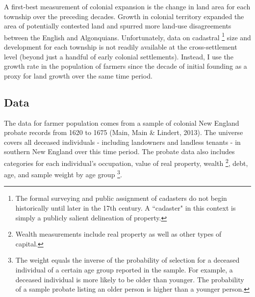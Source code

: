 \documentclass[sn-mathphys]{sn-jnl}%
\theoremstyle{thmstyleone}%
\theoremstyle{thmstyletwo}%
\theoremstyle{thmstylethree}%
\begin{document}
A first-best measurement of colonial expansion is the change in land area for each township over the preceding decades. Growth in colonial territory expanded the area of potentially contested land and spurred more land-use disagreements between the English and Algonquians. Unfortunately, data on cadastral \footnote{The formal surveying and public assignment of cadasters do not begin historically until later in the 17th century. A ``cadaster" in this context is simply a publicly salient delineation of property.} size and development for each township is not readily available at the cross-settlement level (beyond just a handful of early colonial settlements). Instead, I use the growth rate in the population of farmers since the decade of initial founding as a proxy for land growth over the same time period.

\subsection{Data}

The data for farmer population comes from a sample of colonial New England probate records from 1620 to 1675 (Main, Main \& Lindert, 2013). The universe covers all deceased individuals - including landowners and landless tenants - in southern New England over this time period. The probate data also includes categories for each individual's occupation, value of real property, wealth \footnote{Wealth measurements include real property as well as other types of capital.}, debt, age, and sample weight by age group \footnote{The weight equals the inverse of the probability of selection for a deceased individual of a certain age group reported in the sample. For example, a deceased individual is more likely to be older than younger. The probability of a sample probate listing an older person is higher than a younger person.}.


\end{document}
